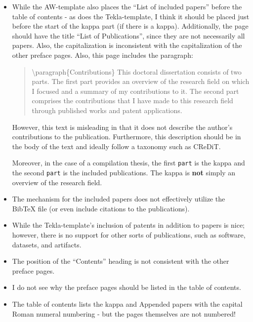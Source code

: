 \documentclass[12pt, twoside]{article}
\begin{document}
\begin{itemize}[label=\color{red}]
  \item While the AW-template also places the ``List of included papers'' before the table of contents - as does the Tekla-template, I think it should be placed just before the start of the kappa part (if there is a kappa). Additionally, the page should have the title ``List of Publications'', since they are not necessarily all papers. Also, the capitalization is inconsistent with the capitalization of the other preface pages. Also, this page includes the paragraph:
    \begin{quote}
    \textbackslash paragraph\{Contributions\} This doctoral dissertation consists of two parts. The first part provides an overview of the research field on which I focused and a summary of my contributions to it. The second part comprises the contributions that I have made to this research field through published works and patent applications.
    \end{quote}

    However, this text is misleading in that it does not describe the author's contributions to the publication. Furthermore, this description should be in the body of the text and ideally follow a taxonomy such as \gls{CReDiT}.

    Moreover, in the case of a compilation thesis, the first \texttt{part} is the kappa and the second \texttt{part} is the included publications. The kappa is \textbf{not} simply an overview of the research field.

  \item The mechanism for the included papers does not effectively utilize the BibTeX file (or even include citations to the publications).

  \item While the Tekla-template's inclusion of patents in addition to papers is nice; however, there is no support for other sorts of publications, such as software, datasets, and artifacts.

  \item The position of the ``Contents'' heading is not consistent with the other preface pages.

  \item I do not see why the preface pages should be listed in the table of contents.

  \item The table of contents lists the kappa and Appended papers with the capital Roman numeral numbering - but the pages themselves are not numbered!


\end{itemize}
\end{document}
